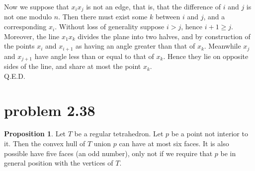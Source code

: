 \documentclass[12pt]{article}
\theoremstyle{definition}
\newtheorem{proposition}{Proposition}
\begin{document}
Now we suppose that $x_ix_j$ is not an edge, that is, that the difference of $i$ and $j$ is not one modulo $n$. Then there must exist some $k$ between $i$ and $j$, and a corresponding $x_i$. Without loss of generality suppose $i > j$, hence $i+ 1 \ge j$. Moreover, the line $x_1x_k$ divides the plane into two halves, and by construction of the points $x_i$ and $x_{i+1}$ as having an angle greater than that of $x_k$. Meanwhile $x_j$ and $x_{j+1}$ have angle less than or equal to that of $x_k$. Hence they lie on opposite sides of the line, and share at most the point $x_k$.\\
 Q.E.D.
 

\section{problem 2.38}

\begin{proposition}
Let $T$ be a regular tetrahedron. Let $p$ be a point not interior to it. Then the convex hull of $T$ union $p$ can have at most six faces. It is also possible have five faces (an odd number), only not if we require that $p$ be in general position with the vertices of $T$. 
\end{proposition}
\end{document}
